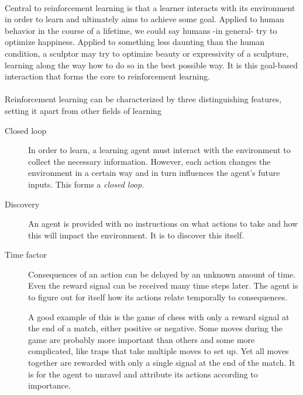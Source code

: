 \paragraph{}
Central to reinforcement learning is that a learner
interacts with its environment in order to learn
and ultimately aims to achieve some goal.
Applied to human behavior in the course of a lifetime,
we could say humans -in general- try to optimize happiness.
Applied to something less daunting than the human condition,
a sculptor may try to optimize beauty
or expressivity of a sculpture,
learning along the way how to do so in the best possible way.
It is this goal-based interaction that forms the core
to reinforcement learning.

\paragraph{}
Reinforcement learning can be characterized
by three distinguishing features,
setting it apart from other fields of learning

\begin{description}
  \item[Closed loop]
    In order to learn, a learning agent must interact
    with the environment to collect the necessary information.
    However, each action changes the environment in a certain way
    and in turn influences the agent's future inputs.
    This forms a \textit{closed loop}.

  \item[Discovery]
    An agent is provided with no instructions on what actions to take
    and how this will impact the environment.
    It is to discover this itself.

  \item[Time factor]
    Consequences of an action can be delayed by an unknown amount of time.
    Even the reward signal can be received many time steps later.
    The agent is to figure out for itself
    how its actions relate temporally to consequences.
    
    A good example of this is the game of chess with only a reward signal
    at the end of a match, either positive or negative.
    Some moves during the game are probably more important
    than others and some more complicated,
    like traps that take multiple moves to set up.
    Yet all moves together are rewarded with only a single signal
    at the end of the match.
    It is for the agent to unravel and attribute
    its actions according to importance.
\end{description}

